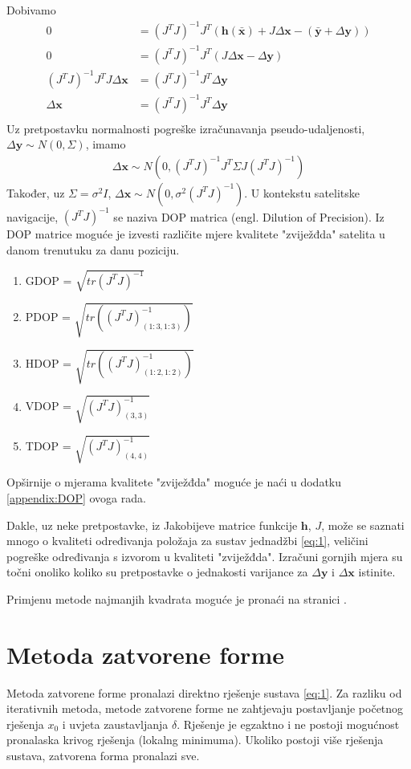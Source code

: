 \documentclass[a4paper,twoside,12pt]{memoir} %
\begin{document}
Dobivamo
\begin{align*}
0 &= (J^TJ)^{-1}J^T (\mathbf{h}(\bar{\mathbf{x}}) + J\Delta \mathbf{x} -(\bar{\mathbf{y}} + \Delta \mathbf{y}))\\
0 &= (J^TJ)^{-1}J^T (J\Delta \mathbf{x} - \Delta \mathbf{y})\\
(J^TJ)^{-1}J^T J\Delta \mathbf{x}& = (J^TJ)^{-1}J^T \Delta \mathbf{y}\\
\Delta \mathbf{x} &= (J^TJ)^{-1}J^T \Delta \mathbf{y}\\
\end{align*}
Uz pretpostavku normalnosti pogreške izračunavanja pseudo-udaljenosti,
\newline $\Delta \mathbf{y} \sim N(0,\Sigma)$, imamo
\begin{align}\label{eq:xerrorDistr}
	\Delta \mathbf{x} \sim N(0,(J^TJ)^{-1}J^T\Sigma J(J^TJ)^{-1})
\end{align}
Također, uz $\Sigma = \sigma^2I$, $\Delta \mathbf{x} \sim N(0,\sigma^2(J^TJ)^{-1})$.
U kontekstu satelitske navigacije, $(J^TJ)^{-1}$ se naziva DOP matrica (engl. Dilution of Precision).
Iz DOP matrice moguće je izvesti različite mjere kvalitete "zviježđda" satelita u danom trenutuku za danu poziciju.
\begin{enumerate}
	\item GDOP = $\sqrt{tr(J^TJ)^{-1}}$
	\item PDOP = $\sqrt{tr((J^TJ)^{-1}_{(1:3,1:3)})}$
	\item HDOP = $\sqrt{tr((J^TJ)^{-1}_{(1:2,1:2)})}$
	\item VDOP = $\sqrt{(J^TJ)^{-1}_{(3,3)}}$
	\item TDOP = $\sqrt{(J^TJ)^{-1}_{(4,4)}}$
\end{enumerate}
Opširnije o mjerama kvalitete "zviježđda" moguće je naći u dodatku \ref{appendix:DOP} ovoga rada.

Dakle, uz neke pretpostavke, iz Jakobijeve matrice funkcije $\mathbf{h}$, $J$, može se saznati mnogo o kvaliteti 
određivanja položaja za sustav jednadžbi \ref{eq:1}, veličini pogreške određivanja
s izvorom u kvaliteti "zviježđda".
Izračuni gornjih mjera su točni onoliko koliko su pretpostavke
o jednakosti varijance za $\Delta \mathbf{y}$ i $\Delta \mathbf{x}$
istinite.

Primjenu metode najmanjih kvadrata moguće je pronaći na stranici \pageref{stranica:nastavakLS}.

\section{Metoda zatvorene forme}
Metoda zatvorene forme pronalazi direktno rješenje sustava \ref{eq:1}.
Za razliku od iterativnih metoda,
metode zatvorene forme ne zahtjevaju postavljanje početnog rješenja $x_0$ i uvjeta zaustavljanja $\delta$. Rješenje je egzaktno i ne postoji mogućnost 
pronalaska krivog rješenja (lokalng minimuma). Ukoliko postoji više rješenja sustava, 
zatvorena forma pronalazi sve.
\end{document}
